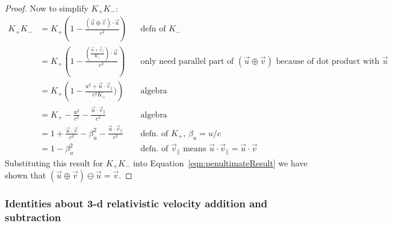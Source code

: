 \documentclass[a4paper]{article}
\theoremstyle{plain}
\theoremstyle{definition}
\newcommand{\vect}[1]{\vec{#1}}
\begin{document}
\begin{proof}
Now to simplify $K_{+}K_{-}$:
\begin{align*}
K_{+}K_{-}
  & = K_{+} \left( 1 - \frac{(\vect{u} \oplus \vect{v}) \cdot \vect{u}}{c^2} \right) & & \text{defn of $K_{-}$} \\
  & = K_{+} \left( 1 - \frac{ (\frac{\vect{u} + \vect{v}_{\parallel}}{K_{+}}) \cdot \vect{u}}{c^2} \right) & & \text{only need parallel part of $(\vect{u} \oplus \vect{v})$ because of dot product with $\vect{u}$} \\
  & = K_{+} \left( 1 - \frac{ u^2 + \vect{u} \cdot \vect{v}_{\parallel}}{c^2 K_{+}}) \right) & & \text{algebra} \\
  & = K_{+} - \frac{u^2}{c^2} - \frac{\vect{u} \cdot \vect{v}_{\parallel}}{c^2} & & \text{algebra} \\
  & = 1 + \frac{\vect{u} \cdot \vect{v}}{c^2} - \beta_u^2 - \frac{\vect{u} \cdot \vect{v}_{\parallel}}{c^2} & & \text{defn. of $K_{+}$, $\beta_u=u/c$} \\
  & = 1 - \beta_u^2 & & \text{defn. of $\vect{v}_{\parallel}$ means $\vect{u} \cdot \vect{v}_{\parallel} = \vect{u} \cdot \vect{v}$}
\end{align*}
Substituting this result for $K_{+}K_{-}$ into
Equation~\eqref{eqn:penultimateResult} we have shown that
$(\vect{u} \oplus \vect{v}) \ominus \vect{u} = \vect{v}$.
\end{proof}


\subsubsection{Identities about 3-d relativistic velocity addition and subtraction}
\label{app:3drelvelocityadd-identities}
\end{document}
